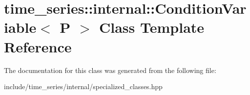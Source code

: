 \hypertarget{classtime__series_1_1internal_1_1ConditionVariable}{}\section{time\+\_\+series\+:\+:internal\+:\+:Condition\+Variable$<$ P $>$ Class Template Reference}
\label{classtime__series_1_1internal_1_1ConditionVariable}


The documentation for this class was generated from the following file\+:\begin{DoxyCompactItemize}
\item 
include/time\+\_\+series/internal/specialized\+\_\+classes.\+hpp\end{DoxyCompactItemize}
